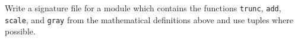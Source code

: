 \label{signature}
Write a signature file for a module which contains the functions \lstinline{trunc}, \lstinline{add}, \lstinline{scale}, and \lstinline{gray} from the mathematical definitions above and use tuples where possible.
